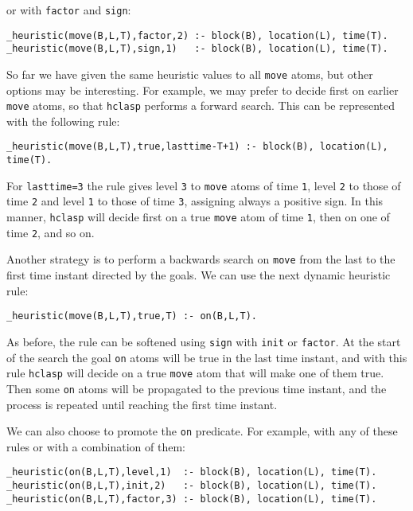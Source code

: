 or with \texttt{factor} and \texttt{sign}:
\begin{verbatim}
_heuristic(move(B,L,T),factor,2) :- block(B), location(L), time(T).
_heuristic(move(B,L,T),sign,1)   :- block(B), location(L), time(T).\end{verbatim}



 So far we have given the same heuristic values to all \texttt{move} atoms, but other options may be interesting. For example, we may prefer to decide first on earlier \texttt{move} atoms,  so that \texttt{hclasp} performs a forward search. This can be represented with the following rule:
\begin{verbatim}
_heuristic(move(B,L,T),true,lasttime-T+1) :- block(B), location(L), time(T).\end{verbatim}

For \texttt{lasttime=3} the rule gives level \texttt{3} to \texttt{move} atoms of time \texttt{1},  level \texttt{2} to those of time \texttt{2} and level \texttt{1} to those of time \texttt{3},  assigning always a positive sign.  In this manner, \texttt{hclasp} will decide first on a true \texttt{move} atom of time \texttt{1}, then on one of time \texttt{2},  and so on. 

  Another strategy is to perform a backwards search on \texttt{move} from the last to the first time instant directed by the goals. We can use the next dynamic heuristic rule:
\begin{verbatim}
_heuristic(move(B,L,T),true,T) :- on(B,L,T).\end{verbatim}

As before, the rule can be softened using \texttt{sign} with \texttt{init} or \texttt{factor}. At the start of the search the goal \texttt{on} atoms will be true in the last time instant,  and with this rule \texttt{hclasp} will decide on a true \texttt{move} atom that will make one of them true. Then some \texttt{on} atoms will be propagated to the previous time instant,  and the process is repeated until reaching the first time instant. 

 We can also choose to promote the \texttt{on} predicate.  For example, with any of these rules or with a combination of them: 
\begin{verbatim}
_heuristic(on(B,L,T),level,1)  :- block(B), location(L), time(T).
_heuristic(on(B,L,T),init,2)   :- block(B), location(L), time(T).
_heuristic(on(B,L,T),factor,3) :- block(B), location(L), time(T).\end{verbatim}

